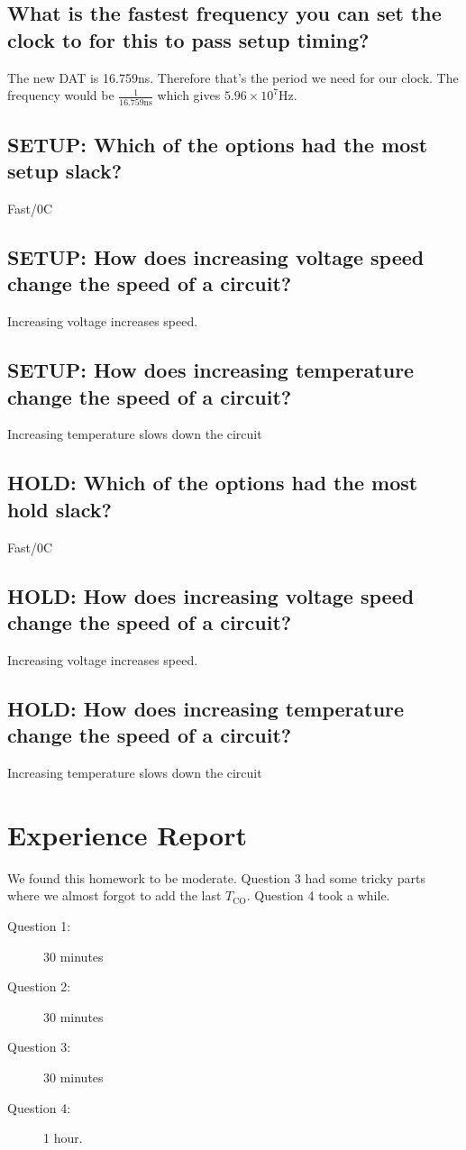 \documentclass[12pt]{article}
\newenvironment{subquestion}[1]{\subsection{#1}
\begin{tcolorbox}[colback=blue!2!white,colframe=blue!20!white]}{\end{tcolorbox}}
\newcommand{\ns}{\text{ns}}
\begin{document}
        \begin{subquestion}{What is the fastest frequency you can set the clock to for this to pass setup timing?}
            The new DAT is 16.759ns. Therefore that's the period we need for our clock. The frequency would be $\frac{1}{16.759\ns}$ which gives $5.96 \times 10^7\text{Hz}$.
        \end{subquestion}
        
        \begin{subquestion}{SETUP: Which of the options had the most setup slack?}
            Fast/0C
        \end{subquestion}

        \begin{subquestion}{SETUP: How does increasing voltage speed change the speed of a circuit?}
            Increasing voltage increases speed.
        \end{subquestion}

        \begin{subquestion}{SETUP: How does increasing temperature change the speed of a circuit?}
            Increasing temperature slows down the circuit
        \end{subquestion}

        \begin{subquestion}{HOLD: Which of the options had the most hold slack?}
            Fast/0C
        \end{subquestion}

        \begin{subquestion}{HOLD: How does increasing voltage speed change the speed of a circuit?}
            Increasing voltage increases speed.
        \end{subquestion}

        \begin{subquestion}{HOLD: How does increasing temperature change the speed of a circuit?}
            Increasing temperature slows down the circuit
        \end{subquestion}

    \section{Experience Report}
        We found this homework to be moderate. Question 3 had some tricky parts where we almost forgot to add the last $T_{\text{CO}}$. Question 4 took a while.
        \begin{description}
            \item[Question 1:] 30 minutes
            \item[Question 2:] 30 minutes
            \item[Question 3:] 30 minutes
            \item[Question 4:] 1 hour.
        \end{description}        
\end{document}
